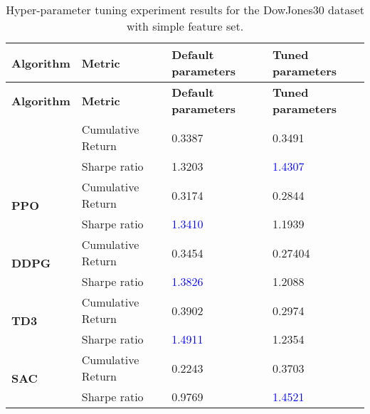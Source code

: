 \begin{longtable}{|l|l|l|l|}
    \caption{Hyper-parameter tuning experiment results for the DowJones30 dataset with simple feature set.}
    \label{tab:experiment_hyperparameters_simple}
    \\ 
    \hline
    \textbf{Algorithm} & \textbf{Metric} & \textbf{Default parameters} & \textbf{Tuned parameters} \\ \midrule
    \endfirsthead

    \hline
    \textbf{Algorithm} & \textbf{Metric} & \textbf{Default parameters} & \textbf{Tuned parameters} \\ \midrule
    \endhead

    \endfoot

    \multirow{2}{*}{\textbf{A2C}}
    & Cumulative Return & 0.3387 & 0.3491 \\ \cline{2-4}
    & Sharpe ratio & 1.3203 & \textcolor{blue}{1.4307} \\ \midrule

    \multirow{2}{*}{\textbf{PPO}}
    & Cumulative Return & 0.3174 & 0.2844 \\ \cline{2-4}
    & Sharpe ratio & \textcolor{blue}{1.3410} & 1.1939 \\ \midrule

    \multirow{2}{*}{\textbf{DDPG}}
    & Cumulative Return & 0.3454 & 0.27404 \\ \cline{2-4}
    & Sharpe ratio & \textcolor{blue}{1.3826} & 1.2088 \\ \midrule

    \multirow{2}{*}{\textbf{TD3}}
    & Cumulative Return & 0.3902 & 0.2974 \\ \cline{2-4}
    & Sharpe ratio & \textcolor{blue}{1.4911} & 1.2354 \\ \midrule

    \multirow{2}{*}{\textbf{SAC}}
    & Cumulative Return & 0.2243 & 0.3703 \\ \cline{2-4}
    & Sharpe ratio & 0.9769 & \textcolor{blue}{1.4521} \\ \midrule
\end{longtable}